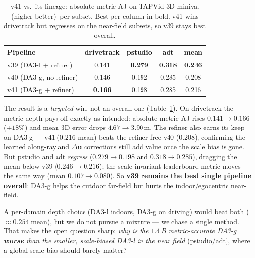 \documentclass[11pt,a4paper]{article}
\begin{document}
\begin{table}[h]
\centering
\caption{v41 vs.\ its lineage: absolute metric-AJ on TAPVid-3D minival (higher better), per subset.
Best per column in bold. v41 wins drivetrack but regresses on the near-field subsets, so v39 stays best
overall.}
\label{tab:v41}
\begin{tabular}{lcccc}
\toprule
Pipeline & drivetrack & pstudio & adt & mean \\
\midrule
v39 (DA3-l $+$ refiner)      & 0.141 & \textbf{0.279} & \textbf{0.318} & \textbf{0.246} \\
v40 (DA3-g, no refiner)      & 0.146 & 0.192 & 0.285 & 0.208 \\
v41 (DA3-g $+$ refiner)      & \textbf{0.166} & 0.198 & 0.285 & 0.216 \\
\bottomrule
\end{tabular}
\end{table}

The result is a \emph{targeted} win, not an overall one (Table~\ref{tab:v41}). On drivetrack the metric
depth pays off exactly as intended: absolute metric-AJ rises $0.141\!\to\!0.166$ ($+18\%$) and mean 3D
error drops $4.67\!\to\!3.90$\,m. The refiner also earns its keep on DA3-g --- v41 ($0.216$ mean) beats the
refiner-free v40 ($0.208$), confirming the learned along-ray and $\Delta\mathbf{u}$ corrections still add
value once the scale bias is gone. But pstudio and adt \emph{regress}
($0.279\!\to\!0.198$ and $0.318\!\to\!0.285$), dragging the mean below v39 ($0.246\!\to\!0.216$); the
scale-invariant leaderboard metric moves the same way (mean $0.107\!\to\!0.080$). So \textbf{v39 remains
the best single pipeline overall}: DA3-g helps the outdoor far-field but hurts the indoor/egocentric
near-field.

A per-domain depth choice (DA3-l indoors, DA3-g on driving) would beat both ($\approx0.254$ mean), but we
do not pursue a mixture --- we chase a single method. That makes the open question sharp: \emph{why is the
$1.4$\,B metric-accurate DA3-g \textbf{worse} than the smaller, scale-biased DA3-l in the near field}
(pstudio/adt), where a global scale bias should barely matter?
\end{document}
